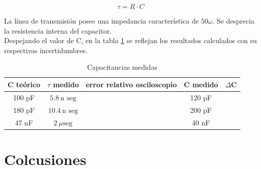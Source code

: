 \documentclass[a4paper,10pt]{article}
\begin{document}
		\begin{equation}
			\tau = R\cdot C
		\end{equation}
	
	\indent La línea de transmisión posee una impedancia característica de 
	$50\omega$. Se desprecia la resistencia interna del capacitor. \\
	\indent Despejando el valor de C, en la tabla \ref{tab002} se reflejan los 
	resultados calculados con su respectivas incertidumbres. \\

		\begin{table}[!htp]
			\centering
			\begin{tabular}{|c|c|c|c|c|}
				\hline
    			C teórico & $\tau$ medido & error relativo osciloscopio & C medido &
				$\Delta$C \\
				\hline
				100 pF & $5.8~\text{n seg}$ &  & 120 pF & \\
				\hline 
				180 pF & $10.4~\text{n seg}$ & & 200 pF & \\
				\hline
				47 nF & $2~\mu\text{seg}$ & & 40 nF & \\
				\hline
			\end{tabular}
			\caption{Capacitancias medidas} 
			\label{tab002} %
		\end{table}

	\newpage
	\section{Colcusiones}
\end{document}
